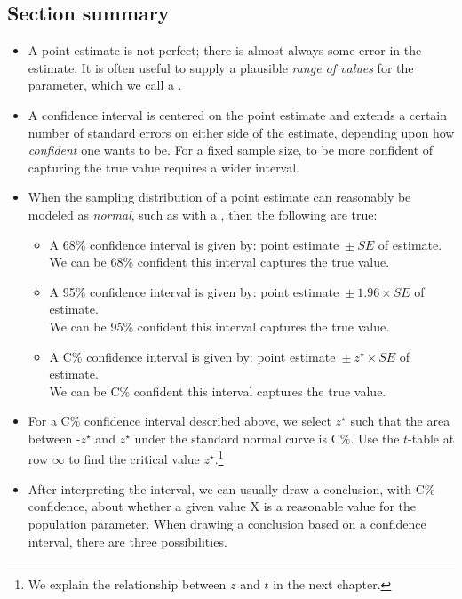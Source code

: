 \subsection*{Section summary}
\begin{itemize}
\item A point estimate is not perfect; there is almost always some error in the estimate. It is often useful to supply a plausible \textit{range of values} for the parameter, which we call a .  

\item A confidence interval is centered on the point estimate and extends a certain number of standard errors on either side of the estimate, depending upon how \textit{confident} one wants to be.  For a fixed sample size, to be more confident of capturing the true value requires a wider interval.


\item When the sampling distribution of a point estimate can reasonably be modeled as
\emph{normal}, such as with a , then the following are true:\vspace{-1mm}
\begin{itemize}
\item A 68\% confidence interval is given by:  point estimate\ $\pm\ SE$ of estimate.
\\We can be 68\% confident this interval captures the true value.
\item A 95\% confidence interval is given by:   point estimate\ $\pm\ 1.96 \times SE$ of estimate.
\\We can be 95\% confident this interval captures the true value.
\item A C\% confidence interval is given by:   point estimate\ $\pm\ z^{\star} \times SE$ of estimate.  
\\We can be C\% confident this interval captures the true value.
\end{itemize}

\item For a C\% confidence interval described above, we select $z^{\star}$ such that the area between -$z^{\star}$ and $z^{\star}$ under the standard normal curve is C\%. Use the $t$-table at row $\infty$ to find the critical value $z^{\star}$.\footnote{We explain the relationship between $z$ and $t$ in the next chapter.}

\item After interpreting the interval, we can usually draw a conclusion, with C\% confidence, about whether a given value X is a reasonable value for the population parameter.  When drawing a conclusion based on a confidence interval, there are three  possibilities.  


\end{itemize}
